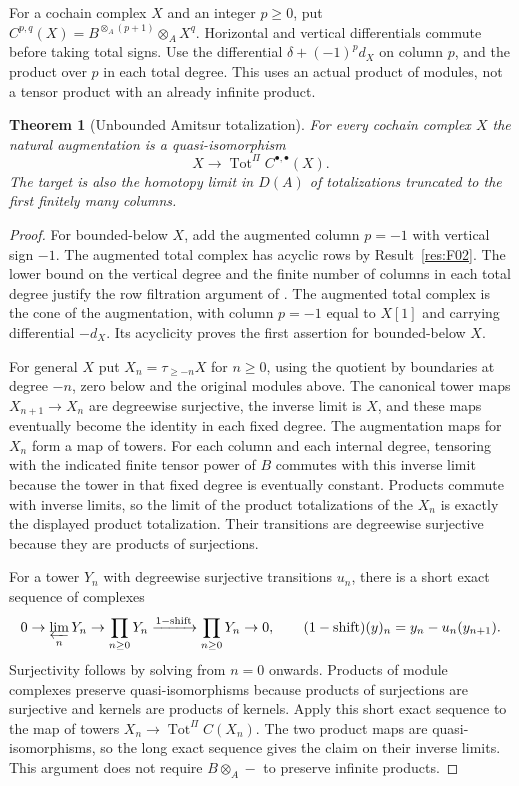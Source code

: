 \documentclass[11pt,oneside,openany]{book}
\newtheorem{theorem}{Theorem}[chapter]
\theoremstyle{definition}
\theoremstyle{remark}
\begin{document}
For a cochain complex \(X\) and an integer \(p\geq0\), put
\(C^{p,q}(X)=B^{\otimes_A(p+1)}\otimes_A X^q\).
Horizontal and vertical differentials commute before taking total
signs. Use the differential \(\delta+(-1)^pd_X\) on column \(p\),
and the product over \(p\) in each total degree.
This uses an actual product of modules, not a tensor product with
an already infinite product.

\begin{theorem}[Unbounded Amitsur totalization]\label{res:F07}
For every cochain complex \(X\) the natural augmentation is a
quasi-isomorphism
\[
       X\longrightarrow \operatorname{Tot}^{\Pi} C^{\bullet,\bullet}(X).
\]
The target is also the homotopy limit in \(D(A)\) of totalizations
truncated to the first finitely many columns.
\end{theorem}
\begin{proof}
For bounded-below \(X\), add the augmented column \(p=-1\) with
vertical sign \(-1\). The augmented total complex has acyclic rows
by Result~\ref{res:F02}. The lower bound on the vertical degree
and the finite number of columns in each total degree justify
the row filtration argument of \cite[B01--B04]{ha-core}. The
augmented total complex is the cone of the augmentation, with
column \(p=-1\) equal to \(X[1]\) and carrying differential \(-d_X\).
Its acyclicity proves the first assertion for bounded-below \(X\).

For general \(X\) put \(X_n=\tau_{\geq-n}X\) for \(n\geq0\), using
the quotient by boundaries at degree \(-n\), zero below and the
original modules above. The canonical tower maps \(X_{n+1}\to X_n\)
are degreewise surjective, the inverse limit is \(X\), and these
maps eventually become the identity in each fixed degree.
The augmentation maps for \(X_n\) form a map of towers.
For each column and each internal degree, tensoring with the indicated
finite tensor power of \(B\) commutes with this inverse limit because
the tower in that fixed degree is eventually constant.
Products commute with inverse limits, so the limit of the product
totalizations of the \(X_n\) is exactly the displayed product
totalization. Their transitions are degreewise surjective because
they are products of surjections.

For a tower \(Y_n\) with degreewise surjective transitions \(u_n\),
there is a short exact sequence of complexes
\[
 0\to\varprojlim_n Y_n\to\prod_{n\geq0}Y_n
 \xrightarrow{1-\mathrm{shift}}\prod_{n\geq0}Y_n\to0,
 \qquad (1-\mathrm{shift})(y)_n=y_n-u_n(y_{n+1}).
\]
Surjectivity follows by solving from \(n=0\) onwards. Products of
module complexes preserve quasi-isomorphisms because products of
surjections are surjective and kernels are products of kernels.
Apply this short exact sequence to the map of towers
\(X_n\to\operatorname{Tot}^{\Pi} C(X_n)\). The two product maps are
quasi-isomorphisms, so the long exact sequence gives the claim on
their inverse limits. This argument does not require \(B\otimes_A-\)
to preserve infinite products.


\end{proof}
\end{document}
